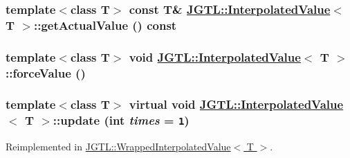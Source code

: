 \hypertarget{class_j_g_t_l_1_1_interpolated_value_7197bfe20e331bfa6be2cbe122b2ffba}{
\subsubsection[getActualValue]{\setlength{\rightskip}{0pt plus 5cm}template$<$class T$>$ const T\& \hyperlink{class_j_g_t_l_1_1_interpolated_value}{JGTL::Interpolated\-Value}$<$ T $>$::get\-Actual\-Value () const}}
\label{class_j_g_t_l_1_1_interpolated_value_7197bfe20e331bfa6be2cbe122b2ffba}


\hypertarget{class_j_g_t_l_1_1_interpolated_value_3098413c5cb85973a20b7066a5ed3171}{
\subsubsection[forceValue]{\setlength{\rightskip}{0pt plus 5cm}template$<$class T$>$ void \hyperlink{class_j_g_t_l_1_1_interpolated_value}{JGTL::Interpolated\-Value}$<$ T $>$::force\-Value ()}}
\label{class_j_g_t_l_1_1_interpolated_value_3098413c5cb85973a20b7066a5ed3171}


\hypertarget{class_j_g_t_l_1_1_interpolated_value_bc1a6a8d484921bc309289c400bf0fbe}{
\subsubsection[update]{\setlength{\rightskip}{0pt plus 5cm}template$<$class T$>$ virtual void \hyperlink{class_j_g_t_l_1_1_interpolated_value}{JGTL::Interpolated\-Value}$<$ T $>$::update (int {\em times} = {\tt 1})}}
\label{class_j_g_t_l_1_1_interpolated_value_bc1a6a8d484921bc309289c400bf0fbe}




Reimplemented in \hyperlink{class_j_g_t_l_1_1_wrapped_interpolated_value_2bdc736eda165b27af022bae1f352aae}{JGTL::Wrapped\-Interpolated\-Value$<$ T $>$}.

